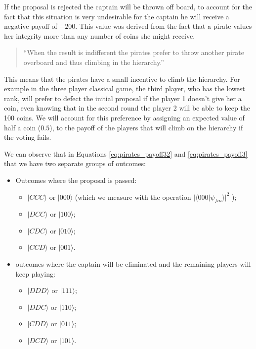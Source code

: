 If the proposal is rejected the captain will be thrown off board, to account for the fact that this situation is very undesirable for the captain he will receive a negative payoff of $-200$. This value was derived from the fact that a pirate values her integrity more than any number of coins she might receive.




\begin{quotation}
``When the result is indifferent the pirates prefer to throw another pirate overboard and thus climbing in the hierarchy.''
\end{quotation}

This means that the pirates have a small incentive to climb the hierarchy. For example in the three player classical game, the third player, who has the lowest rank, will prefer to defect the initial proposal if the player 1 doesn't give her a coin, even knowing that in the second round the player 2 will be able to keep the 100 coins. We will account for this preference by assigning an expected value of half a coin ($0.5$), to the payoff of the players that will climb on the hierarchy if the voting fails.


We can observe that in Equations \ref{eq:pirates_payoff32} and \ref{eq:pirates_payoff3} that we have two separate groups of outcomes: 
\begin{itemize}
\item Outcomes where the proposal is passed:
\begin{itemize}
\item $\vert CCC\rangle$ or $\vert000\rangle$ (which we measure with the operation $\vert\langle000\vert\psi_{fin}\rangle\vert^{2}$ );
\item $\vert DCC\rangle$ or $\vert100\rangle$;
\item $\vert CDC\rangle$ or $\vert010\rangle$;
\item $\vert CCD\rangle$ or $\vert001\rangle$.
\end{itemize}
\item outcomes where the captain will be eliminated and the remaining players will keep playing:
\begin{itemize}
\item $\vert DDD\rangle$ or $\vert111\rangle$;
\item $\vert DDC\rangle$ or $\vert110\rangle$;
\item $\vert CDD\rangle$ or $\vert011\rangle$;
\item $\vert DCD\rangle$ or $\vert101\rangle$.
\end{itemize}
\end{itemize}



